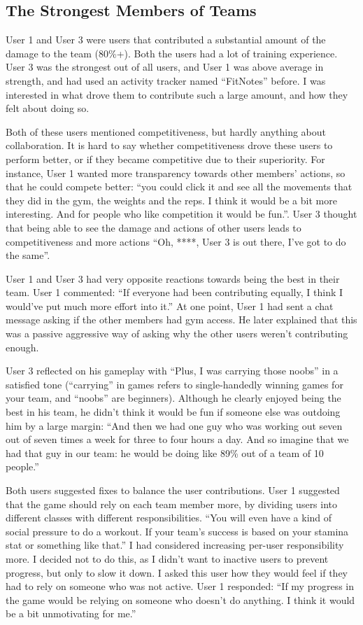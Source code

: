 \documentclass{l4proj}
\begin{document}
\subsection{The Strongest Members of Teams}
User 1 and User 3 were users that contributed a substantial amount of the damage to the team (80\%+). Both the users had a lot of training experience. User 3 was the strongest out of all users, and User 1 was above average in strength, and had used an activity tracker named ``FitNotes'' before. I was interested in what drove them to contribute such a large amount, and how they felt about doing so. 

Both of these users mentioned competitiveness, but hardly anything about collaboration. It is hard to say whether competitiveness drove these users to perform better, or if they became competitive due to their superiority. For instance, User 1 wanted more transparency towards other members' actions, so that he could compete better: ``you could click it and see all the movements that they did in the gym, the weights and the reps. I think it would be a bit more interesting. And for people who like competition it would be fun.''. User 3 thought that being able to see the damage and actions of other users leads to competitiveness and more actions ``Oh, ****, User 3 is out there, I've got to do the same''. 

User 1 and User 3 had very opposite reactions towards being the best in their team. User 1 commented: ``If everyone had been contributing equally, I think I would've put much more effort into it.'' At one point, User 1 had sent a chat message asking if the other members had gym access. He later explained that this was a passive aggressive way of asking why the other users weren't contributing enough. 

User 3 reflected on his gameplay with ``Plus, I was carrying those noobs'' in a satisfied tone (``carrying'' in games refers to single-handedly winning games for your team, and ``noobs'' are beginners). Although he clearly enjoyed being the best in his team, he didn't think it would be fun if someone else was outdoing him by a large margin: ``And then we had one guy who was working out seven out of seven times a week for three to four hours a day. And so imagine that we had that guy in our team: he would be doing like 89\% out of a team of 10 people.'' 

Both users suggested fixes to balance the user contributions. User 1 suggested that the game should rely on each team member more, by dividing users into different classes with different responsibilities. ``You will even have a kind of social pressure to do a workout. If your team's success is based on your stamina stat or something like that.'' I had considered increasing per-user responsibility more. I decided not to do this, as I didn't want to inactive users to prevent progress, but only to slow it down. I asked this user how they would feel if they had to rely on someone who was not active. User 1 responded: ``If my progress in the game would be relying on someone who doesn't do anything. I think it would be a bit unmotivating for me.'' 
\end{document}
